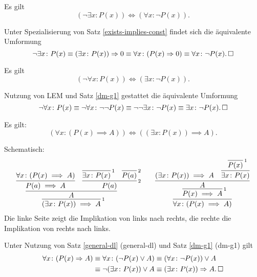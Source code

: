 \begin{Satz}%
\label{dm-g1} Es gilt
\[(\neg\exists x\colon P(x))\iff (\forall x\colon \neg P(x)).\]
\end{Satz}
\begin{Beweis} Unter Spezialisierung von Satz \ref{exists-implies-const}
findet sich die äquivalente Umformung%
\[\neg\exists x\colon P(x)\equiv (\exists x\colon P(x))\Rightarrow 0
\equiv \forall x\colon (P(x)\Rightarrow 0)
\equiv \forall x\colon \neg P(x).\,\square\]
\end{Beweis}
\begin{Satz}%
\label{dm-g2} Es gilt
\[(\neg\forall x\colon P(x))\iff (\exists x\colon \neg P(x)).\]
\end{Satz}
\begin{Beweis}
Nutzung von LEM und Satz \ref{dm-g1} gestattet die äquivalente
Umformung%
\[\neg\forall x\colon P(x)
\equiv\neg\forall x\colon \neg\neg P(x)
\equiv\neg\neg\exists x\colon \neg P(x)
\equiv\exists x\colon \neg P(x).\,\square\]
\end{Beweis}

\begin{Satz}\label{exists-implies-const}
Es gilt:
\[(\forall x\colon (P(x)\implies A)) \iff ((\exists x\colon P(x))\implies A).\]
\end{Satz}
\begin{Beweis} Schematisch:\\
\[\begin{array}{c@{\qquad}c}
\infer[\infernote{1}]{(\exists x\colon P(x))\implies A}{
\infer{A}{
  \infer{P(a)\implies A}{\forall x\colon (P(x)\implies A)}
  & \infer[\infernote{2}]{P(a)}{
      \infer[\infernote{1}]{\exists x\colon P(x)}{}
      & \infer[\infernote{2}]{P(a)}{}}
}}
&
\infer{\forall x\colon (P(x)\implies A)}{
  \infer[\infernote{1}]{P(x)\implies A}{
    \infer{A}{
      (\exists x\colon P(x))\implies A
      & \infer{\exists x\colon P(x)}{
          \infer[\infernote{1}]{P(x)}{}}}}}
\end{array}
\]
Die linke Seite zeigt die Implikation von links nach rechts,
die rechte die Implikation von rechts nach links.\,\qedsymbol
\end{Beweis}
\begin{Beweis}
Unter Nutzung von Satz \ref{general-dl} (general-dl)
und Satz \ref{dm-g1} (dm-g1) gilt
\begin{align*}
\forall x\colon (P(x)\Rightarrow A)
&\equiv \forall x\colon (\neg P(x)\lor A)
\equiv (\forall x\colon \neg P(x))\lor A\\
&\equiv \neg (\exists x\colon P(x))\lor A
\equiv (\exists x\colon P(x))\Rightarrow A.\,\square
\end{align*}
\end{Beweis}

